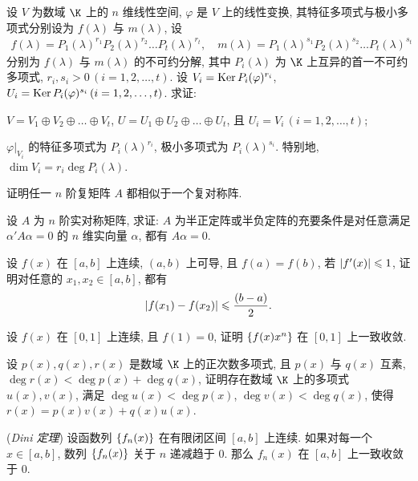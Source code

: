\begin{exercise}[series=exer]
  \sitem 设 $ V $ 为数域 $ \K $ 上的 $ n $ 维线性空间, $ \varphi $ 是 $ V $ 上的线性变换, 其特征多项式与极小多项式分别设为 $ f(\lambda) $ 与 $ m(\lambda) $, 设
  \begin{align*}
      f(\lambda) = P_{1}(\lambda)^{r_{1}}P_{2}(\lambda)^{r_{2}}\dots P_{t}(\lambda)^{r_{t}}, \quad m(\lambda) = P_{1}(\lambda)^{s_{1}}P_{2}(\lambda)^{s_{2}}\dots P_{t}(\lambda)^{s_{t}}
  \end{align*}
  分别为 $ f(\lambda) $ 与 $ m(\lambda) $ 的不可约分解, 其中 $ P_{i}(\lambda) $ 为 $ \K $ 上互异的首一不可约多项式, $ r_{i}, s_{i} > 0\, (i = 1, 2, \dots, t) $. 设 $ V_{i} = \operatorname{Ker} P_{i}(\varphi)^{r_{i}} $, $ U_{i} = \operatorname{Ker} P_{i}(\varphi)^{s_{i}}\,(i = 1, 2, \dots, t) $. 求证:
  \begin{exercise}
      \item $ V = V_{1} \oplus V_{2} \oplus \dots \oplus V_{t} $, $ U = U_{1} \oplus U_{2} \oplus \dots \oplus U_{t} $, 且 $ U_{i} = V_{i}\,(i = 1, 2, \dots, t) $;
      \item $ \varphi|_{V_{i}} $ 的特征多项式为 $ P_{i}(\lambda)^{r_{i}} $, 极小多项式为 $ P_{i}(\lambda)^{s_{i}} $. 特别地, $ \dim V_{i} = r_{i}\deg P_{i}(\lambda) $.
  \end{exercise}
  \item 证明任一 $ n $ 阶复矩阵 $ A $ 都相似于一个复对称阵.
  \item 设 $ A $ 为 $ n $ 阶实对称矩阵, 求证: $ A $ 为半正定阵或半负定阵的充要条件是对任意满足 $ \alpha' A\alpha = 0 $ 的 $ n $ 维实向量 $ \alpha $, 都有 $ A\alpha = 0 $.
  \item 设 $ f(x) $ 在 $ [a, b] $ 上连续, $ (a, b) $ 上可导, 且 $ f(a) = f(b) $, 若 $ \abs{f'(x)} \leqslant 1 $, 证明对任意的 $ x_{1}, x_{2} \in [a, b] $, 都有
  \begin{align*}
      \abs{f(x_{1}) - f(x_{2})} \leqslant \frac{(b - a)}{2}.
  \end{align*}
  \item 设 $ f(x) $ 在 $ [0, 1] $ 上连续, 且 $ f(1) = 0 $, 证明 $ \qty{f(x)x^{n}} $ 在 $ [0, 1] $ 上一致收敛.
  \item 设 $ p(x), q(x), r(x) $ 是数域 $ \K $ 上的正次数多项式, 且 $ p(x) $ 与 $ q(x) $ 互素, $ \deg r(x) < \deg p(x) + \deg q(x) $, 证明存在数域 $ \K $ 上的多项式 $ u(x), v(x) $, 满足 $ \deg u(x) < \deg p(x) $, $ \deg v(x) < \deg q(x) $, 使得 $ r(x) = p(x)v(x) + q(x)u(x) $.
  \item (\emph{Dini 定理}) 设函数列 $ \qty{f_{n}(x)} $ 在有限闭区间 $ [a, b] $ 上连续. 如果对每一个 $ x\in [a, b] $, 数列 $ \qty{f_{n}(x)} $ 关于 $ n $ 递减趋于 $ 0 $. 那么 $ f_{n}(x) $ 在 $ [a, b] $ 上一致收敛于 $ 0 $.

\end{exercise}
